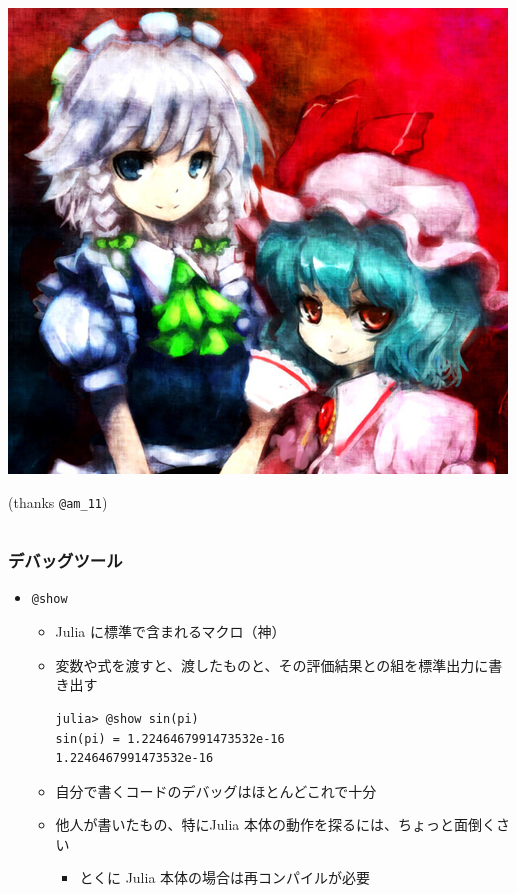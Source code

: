 \documentclass[dvipdfmx]{beamer}
\begin{document}
\begin{frame}[containsverbatim]
\begin{columns}
\begin{column}{.3\linewidth}
        \includegraphics[width=\linewidth]{sakuremi.jpg}

        (thanks \verb|@am_11|)
    \end{column}
\end{columns}
\end{frame}

\begin{frame}[containsverbatim]
    \frametitle{デバッグツール}
    \begin{itemize}
        \item \verb|@show|
        \begin{itemize}
            \item Julia に標準で含まれるマクロ（神）
            \item 変数や式を渡すと、渡したものと、その評価結果との組を標準出力に書き出す
            \begin{lstlisting}
julia> @show sin(pi)
sin(pi) = 1.2246467991473532e-16
1.2246467991473532e-16
            \end{lstlisting}
            \item 自分で書くコードのデバッグはほとんどこれで十分
            \item 他人が書いたもの、特にJulia 本体の動作を探るには、ちょっと面倒くさい
            \begin{itemize}
                \item とくに Julia 本体の場合は再コンパイルが必要
            \end{itemize}
        \end{itemize}
\end{itemize}
\end{frame}
\end{document}
